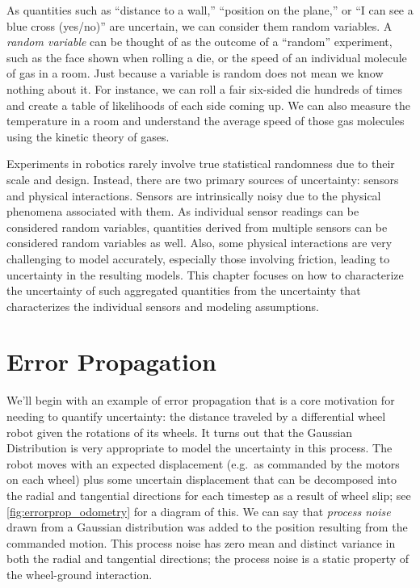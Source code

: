 As quantities such as ``distance to a wall,'' ``position on the plane,'' or ``I can see a blue cross (yes/no)'' are uncertain, we can
consider them random variables. A \textsl{random variable} can be thought of as the outcome of a ``random''
experiment, such as the face shown when rolling a die, or the speed of an individual molecule of gas in a room. Just because a
variable is random does not mean we know nothing about it. For instance, we can roll a fair six-sided die hundreds of times
and create a table of likelihoods of each side coming up. We can also measure the temperature in a room and understand the
average speed of those gas molecules using the kinetic theory of gases.

Experiments in robotics rarely involve true statistical randomness due to their scale and design. Instead, there are two primary sources
of uncertainty: sensors and physical interactions. Sensors are intrinsically noisy due to the physical phenomena associated with them.
As individual sensor readings can be considered random variables, quantities derived from multiple sensors can be considered random variables as well. Also, some physical interactions are very challenging to model accurately, especially those involving
friction, leading to uncertainty in the resulting models. This chapter focuses on how to characterize the uncertainty
of such aggregated quantities from the uncertainty that characterizes the individual sensors and modeling assumptions.

\section{Error Propagation}\label{sec:errorprop}
We'll begin with an example of error propagation that is a core motivation for needing to quantify uncertainty: the distance traveled by a
differential wheel robot given the rotations of its wheels. It turns out that the Gaussian Distribution is very appropriate to model the uncertainty in this process. The robot moves with an expected displacement (e.g.\ as commanded by the motors on each wheel) plus some uncertain displacement that can be decomposed into the radial and tangential directions for each timestep as a result of wheel slip; see \cref{fig:errorprop_odometry} for a diagram of this. We can say that \textsl{process noise} drawn from a Gaussian distribution was added to the position resulting from the commanded motion. This process noise has zero mean and distinct variance in both the radial and tangential directions; the process noise is a static property of the wheel-ground interaction.

